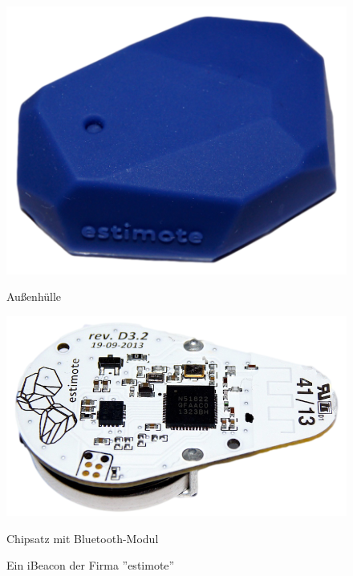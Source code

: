 \begin{figure}[h!]
	\centering
	\begin{minipage}[t]{5cm}
		\includegraphics[scale=0.15]{pictures/estimote-beacon-outside}
		\caption{Außenhülle}
		\label{estimote-outside}
	\end{minipage}
	\hspace{2cm}
	\begin{minipage}[t]{5cm}
			\includegraphics[scale=0.2]{pictures/estimote-beacon-inside}
			\caption{Chipsatz mit Bluetooth-Modul}
			\label{estimote-inside}
	\end{minipage}
		\caption{Ein iBeacon der Firma ''estimote''}
		\label{estimote-beacon}
\end{figure}


